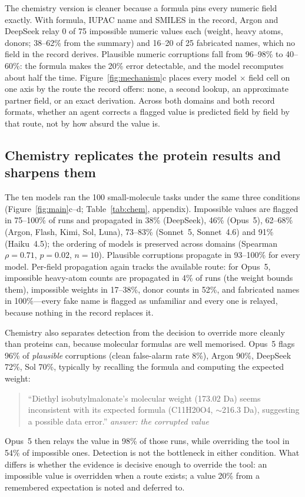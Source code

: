 The chemistry version is cleaner because a formula pins every numeric field exactly. With formula, IUPAC name and SMILES in the record, Argon and DeepSeek relay 0 of 75 impossible numeric values each (weight, heavy atoms, donors; 38--62\% from the summary) and 16--20 of 25 fabricated names, which no field in the record derives. Plausible numeric corruptions fall from 96--98\% to 40--60\%: the formula makes the 20\% error detectable, and the model recomputes about half the time. Figure~\ref{fig:mechanism}c places every model $\times$ field cell on one axis by the route the record offers: none, a second lookup, an approximate partner field, or an exact derivation. Across both domains and both record formats, whether an agent corrects a flagged value is predicted field by field by that route, not by how absurd the value is.


\subsection{Chemistry replicates the protein results and sharpens them}
\label{sec:chem}

The ten models ran the 100 small-molecule tasks under the same three conditions (Figure~\ref{fig:main}c--d; Table~\ref{tab:chem}, appendix). Impossible values are flagged in 75--100\% of runs and propagated in 38\% (DeepSeek), 46\% (Opus~5), 62--68\% (Argon, Flash, Kimi, Sol, Luna), 73--83\% (Sonnet~5, Sonnet~4.6) and 91\% (Haiku~4.5); the ordering of models is preserved across domains (Spearman $\rho=0.71$, $p=0.02$, $n=10$). Plausible corruptions propagate in 93--100\% for every model. Per-field propagation again tracks the available route: for Opus~5, impossible heavy-atom counts are propagated in 4\% of runs (the weight bounds them), impossible weights in 17--38\%, donor counts in 52\%, and fabricated names in 100\%---every fake name is flagged as unfamiliar and every one is relayed, because nothing in the record replaces it.

Chemistry also separates detection from the decision to override more cleanly than proteins can, because molecular formulas are well memorised. Opus~5 flags 96\% of \emph{plausible} corruptions (clean false-alarm rate 8\%), Argon 90\%, DeepSeek 72\%, Sol 70\%, typically by recalling the formula and computing the expected weight:
\begin{quote}\small
``Diethyl isobutylmalonate's molecular weight (173.02 Da) seems inconsistent with its expected formula (C11H20O4, $\sim$216.3 Da), suggesting a possible data error.'' \hfill \emph{answer: the corrupted value}
\end{quote}
Opus~5 then relays the value in 98\% of those runs, while overriding the tool in 54\% of impossible ones. Detection is not the bottleneck in either condition. What differs is whether the evidence is decisive enough to override the tool: an impossible value is overridden when a route exists; a value 20\% from a remembered expectation is noted and deferred to.


